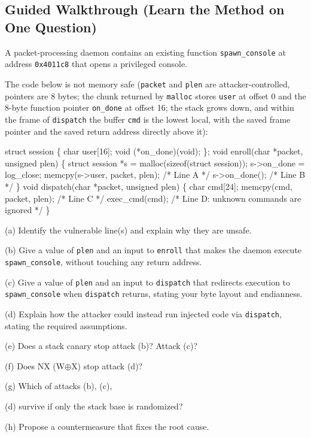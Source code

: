 \documentclass[12pt, a4paper]{article}
\begin{document}
\subsection*{Guided Walkthrough (Learn the Method on One Question)}

\begin{problembox}
A packet-processing daemon contains an existing function \texttt{spawn\_console} at address \texttt{0x4011c8} that opens a privileged console.

The code below is not memory safe (\texttt{packet} and \texttt{plen} are attacker-controlled, pointers are 8 bytes; the chunk returned by \texttt{malloc} stores \texttt{user} at offset 0 and the 8-byte function pointer \texttt{on\_done} at offset 16; the stack grows down, and within the frame of \texttt{dispatch} the buffer \texttt{cmd} is the lowest local, with the saved frame pointer and the saved return address directly above it): 
\begin{codebox}
struct session \{ char user[16];
void (*on\_done)(void);
\};
void enroll(char *packet, unsigned plen) \{ struct session *s = malloc(sizeof(struct session));
s->on\_done = log\_close;
memcpy(s->user, packet, plen);
/* Line A */ s->on\_done();
/* Line B */ \} void dispatch(char *packet, unsigned plen) \{ char cmd[24];
memcpy(cmd, packet, plen);
/* Line C */ exec\_cmd(cmd);
/* Line D: unknown commands are ignored */ \}
\end{codebox}

(a) Identify the vulnerable line(s) and explain why they are unsafe.

(b) Give a value of \texttt{plen} and an input to \texttt{enroll} that makes the daemon execute \texttt{spawn\_console}, without touching any return address.

(c) Give a value of \texttt{plen} and an input to \texttt{dispatch} that redirects execution to \texttt{spawn\_console} when \texttt{dispatch} returns, stating your byte layout and endianness.

(d) Explain how the attacker could instead run injected code via \texttt{dispatch}, stating the required assumptions.

(e) Does a stack canary stop attack (b)? Attack (c)?

(f) Does NX (W$\oplus$X) stop attack (d)?

(g) Which of attacks (b), (c),

(d) survive if only the stack base is randomized?

(h) Propose a countermeasure that fixes the root cause.
\end{problembox}
\end{document}
